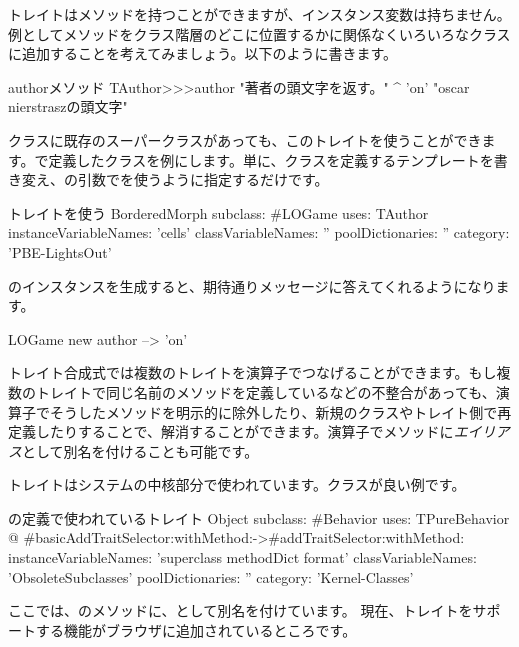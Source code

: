 \documentclass[a4paper,10pt,twoside]{book}
\begin{document}
トレイトはメソッドを持つことができますが、インスタンス変数は持ちません。例としてメソッドをクラス階層のどこに位置するかに関係なくいろいろなクラスに追加することを考えてみましょう。以下のように書きます。

\begin{method}[author]{authorメソッド}
TAuthor>>>author
    "著者の頭文字を返す。"
	^ 'on'    "oscar nierstraszの頭文字"
\end{method}

\noindent
クラスに既存のスーパークラスがあっても、このトレイトを使うことができます。で定義したクラスを例にします。単に、クラスを定義するテンプレートを書き変え、の引数でを使うように指定するだけです。

\begin{classdef}[sbegamewithtrait]{トレイトを使う}
BorderedMorph subclass: #LOGame
	uses: TAuthor
	instanceVariableNames: 'cells'
	classVariableNames: ''
	poolDictionaries: ''
	category: 'PBE-LightsOut'
\end{classdef}

のインスタンスを生成すると、期待通りメッセージに答えてくれるようになります。

\begin{code}{}
LOGame new author --> 'on'
\end{code}

トレイト合成式では複数のトレイトを\ct{+}演算子でつなげることができます。もし複数のトレイトで同じ名前のメソッドを定義しているなどの不整合があっても、\ct{-}演算子でそうしたメソッドを明示的に除外したり、新規のクラスやトレイト側で再定義したりすることで、解消することができます。演算子でメソッドに\emph{エイリアス}として別名を付けることも可能です。

トレイトはシステムの中核部分で使われています。\mbox{}クラスが良い例です。

\begin{classdef}[behaviorwithtraits]{の定義で使われているトレイト}
Object subclass: #Behavior
	uses: TPureBehavior @ {#basicAddTraitSelector:withMethod:->#addTraitSelector:withMethod:}
	instanceVariableNames: 'superclass methodDict format'
	classVariableNames: 'ObsoleteSubclasses'
	poolDictionaries: ''
	category: 'Kernel-Classes'
\end{classdef}
\noindent
ここでは、のメソッドに、として別名を付けています。
現在、トレイトをサポートする機能がブラウザに追加されているところです。
\end{document}
